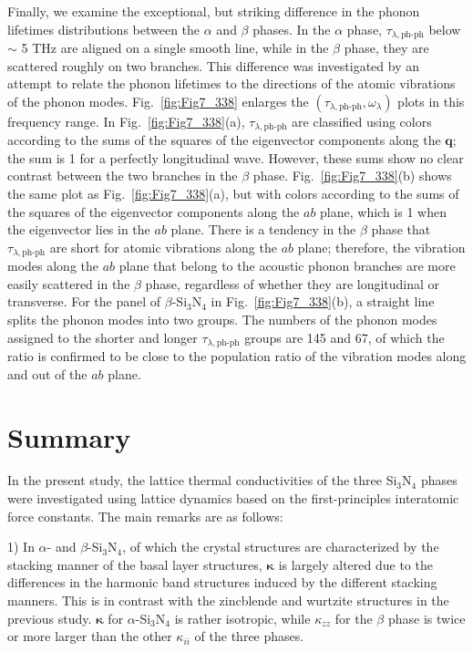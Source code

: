 \documentclass[twocolumn,amsmath,amssymb,a4paper,prb,superscriptaddress,floatfix]{revtex4-1}
\begin{document}
Finally, we examine the exceptional, but striking difference in the phonon
lifetimes
distributions between the $\alpha$ and $\beta$ phases. In the $\alpha$ phase,
$\tau_{\lambda,\text{ph-ph}}$ below $\sim$ 5 THz are aligned on a single smooth line, while in
the $\beta$ phase, they are scattered roughly on two branches. This difference
was investigated by an attempt to relate the phonon lifetimes to the directions of the
atomic vibrations of the phonon modes. Fig.~\ref{fig:Fig7_338} enlarges the
$(\tau_{\lambda,\text{ph-ph}},\omega_\lambda)$ plots in this frequency range. In
Fig.~\ref{fig:Fig7_338}(a), $\tau_{\lambda,\text{ph-ph}}$ are classified using colors
according to the sums of the squares of the eigenvector components along the
$\mathbf{q}$; the sum is 1 for a perfectly longitudinal wave. However, these
sums show no clear contrast between the two branches in the $\beta$ phase.
Fig.~\ref{fig:Fig7_338}(b) shows the same plot as Fig.~\ref{fig:Fig7_338}(a),
but with colors according to the sums of the squares of the eigenvector
components along the $ab$ plane, which is 1 when the eigenvector lies in the
$ab$ plane.  There is a tendency in the $\beta$ phase that
$\tau_{\lambda,\text{ph-ph}}$ are
short for atomic vibrations along the $ab$ plane; therefore, the vibration
modes along the $ab$ plane that belong to the acoustic phonon branches are more
easily scattered in the $\beta$ phase, regardless of whether they are
longitudinal or transverse. For the panel of $\beta$-Si$_3$N$_4$ in
Fig.~\ref{fig:Fig7_338}(b), a straight line splits the phonon modes into two
groups. The numbers of the phonon modes assigned to the shorter and longer
$\tau_{\lambda,\text{ph-ph}}$ groups are 145 and 67, of which the ratio is confirmed
to be close to the population ratio of the vibration modes along and out of the
$ab$ plane.


\section{Summary}

In the present study, the lattice thermal conductivities of the
three Si$_3$N$_4$ phases were investigated using lattice dynamics based on the
first-principles interatomic force constants. The main remarks are as follows:

1) In $\alpha$- and $\beta$-Si$_3$N$_4$, of which the crystal structures are
characterized by the stacking manner of the basal layer structures,
$\boldsymbol{\kappa}$ is largely altered due to the differences in the harmonic
band structures induced by the different stacking manners. This is in contrast
with the zincblende and wurtzite structures in the previous
study\cite{phono3py}. $\boldsymbol{\kappa}$ for $\alpha$-Si$_3$N$_4$ is rather
isotropic, while $\kappa$$_{zz}$ for the $\beta$ phase is twice or more larger
than the other $\kappa_{ii}$ of the three phases.
\end{document}
